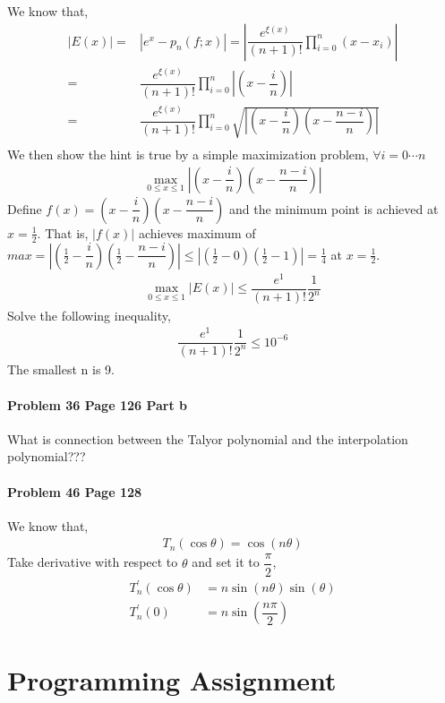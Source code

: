 \documentclass[paper=a4, fontsize=11pt]{scrartcl} %
\numberwithin{equation}{section} %
\numberwithin{figure}{section} %
\numberwithin{table}{section} %
\begin{document}
We know that,
\begin{align*}
	|E(x)| = &|e^x-p_n(f;x)| = |\dfrac{e^{\xi(x)}}{(n+1)!}\prod_{i=0}^{n}(x-x_i)|\\
		 = &\dfrac{e^{\xi(x)}}{(n+1)!}\prod_{i=0}^{n}|(x-\dfrac{i}{n})|\\
 		 = &\dfrac{e^{\xi(x)}}{(n+1)!}\prod_{i=0}^{n}\sqrt{|(x-\dfrac{i}{n})(x-\dfrac{n-i}{n})|}\\
\end{align*}
We then show the hint is true by a simple maximization problem, $ \forall i=0\cdots n $
\begin{align*}
	\max_{0\leq x\leq 1} |(x-\dfrac{i}{n})(x-\dfrac{n-i}{n})|	
\end{align*}
Define $ f(x)=(x-\dfrac{i}{n})(x-\dfrac{n-i}{n}) $ and the minimum point is achieved at $ x=\frac{1}{2} $. That is, $ |f(x)| $ achieves maximum of $ max = |(\frac{1}{2}-\dfrac{i}{n})(\frac{1}{2}-\dfrac{n-i}{n})|\leq |(\frac{1}{2}-0)(\frac{1}{2}-1)|=\frac{1}{4} $ at $ x=\frac{1}{2} $.
\begin{align*}
	\max_{0\leq x\leq 1}|E(x)|\leq \dfrac{e^{1}}{(n+1)!}\dfrac{1}{2^n}
\end{align*}
Solve the following inequality,
\begin{align*}
	\dfrac{e^{1}}{(n+1)!}\dfrac{1}{2^n}\leq 10^{-6}
\end{align*}
The smallest n is 9.
\paragraph{\textbf{Problem 36 Page 126 Part b}}
What is connection between the Talyor polynomial and the interpolation polynomial???
\newpage

\paragraph{\textbf{Problem 46 Page 128}}
We know that,
\begin{align*}
	T_n(\cos\theta)=\cos(n\theta)
\end{align*}
Take derivative with respect to $ \theta $ and set it to $ \dfrac{\pi}{2} $,
\begin{align*}
	T_n^\prime(\cos\theta)&=n\sin(n\theta)\sin(\theta)\\
	T_n^\prime(0)&=n\sin(\dfrac{n\pi}{2})
\end{align*}




\newpage
\section*{Programming Assignment}
\end{document}
